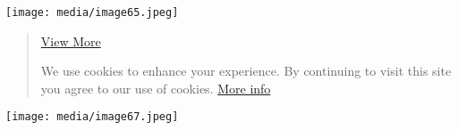 \documentclass[]{article}
\begin{document}
\texttt{[image: media/image65.jpeg]}

\begin{quote}
\href{https://www.electronics-tutorials.ws/accircuits/series-resonance.html/comment-page-2\#comments}{View
More}

We use cookies to enhance your experience. By continuing to visit this
site you agree to our use of cookies.
\href{http://wikipedia.org/wiki/HTTP_cookie}{More info}
\end{quote}

\texttt{[image: media/image67.jpeg]}
\end{document}
